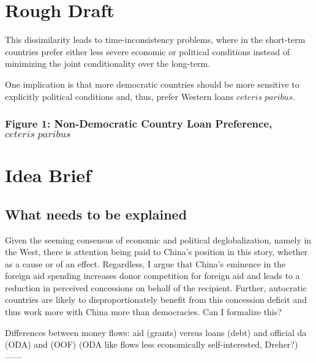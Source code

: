 \section*{Rough Draft}
This dissimilarity leads to time-inconsistency problems, where in the short-term countries prefer either less severe economic or political conditions instead of minimizing the joint conditionality over the long-term.


One implication is that more democratic countries should be more sensitive to explicitly political conditions and, thus, prefer Western loans $ceteris\;paribus$. 

\subsubsection*{Figure 1: Non-Democratic Country Loan Preference, $ceteris\;paribus$}

\section*{Idea Brief}
\subsection*{What needs to be explained}
Given the seeming consensus of economic and political deglobalization,  namely in the West, there is attention being paid to China's position in this story, whether as a cause or of an effect. Regardless, I argue that China's eminence in the foreign aid spending increases donor competition for foreign aid and leads to a reduction in perceived concessions on behalf of the recipient. Further, autocratic countries are likely to disproportionately benefit from this concession deficit and thus work more with China more than democracies. Can I formalize this?

Differences between money flows: aid (grants) versus loans (debt) and official da (ODA) and (OOF) (ODA like flows less economically self-interested, Dreher?)
------

